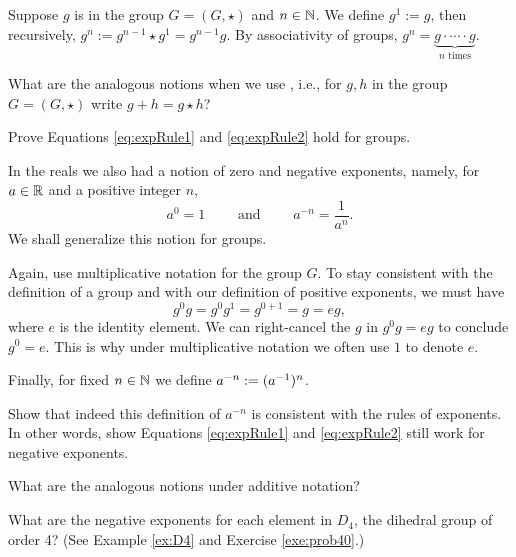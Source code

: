 \documentclass[../algebraNotesMSRI-UP2016.tex]{subfiles}
\begin{document}
\begin{frame}[c]
Suppose $g$ is in the group $G=(G,\star)$ and $n\in\mathbb N$.  We define $g^1:=g$, then recursively, $g^n:=g^{n-1}\star g^1=g^{n-1}g$.  By associativity of groups, $g^n=\underbrace{g\cdot\cdots \cdot g}_{\text{$n$ times}}$.

\smallGap
\begin{que}
What are the analogous notions when we use , i.e., for $g,h$ in the group $G=(G,\star)$ write $g+h=g\star h$?
\end{que}

\smallGap
\begin{exe}\label{exe:expRules1and2}
Prove Equations \eqref{eq:expRule1} and \eqref{eq:expRule2} hold for groups.
\end{exe}
\end{frame}

\begin{frame}[c]
In the reals we also had a notion of zero and negative exponents, namely, for $a\in\mathbb R$ and a positive integer $n$,
\[
a^0=1\qquad\text{ and }\qquad a^{-n}=\frac{1}{a^n}.
\]
We shall generalize this notion for groups.
\end{frame}

\begin{frame}[c]
Again, use multiplicative notation for the group $G$.  To stay consistent with the definition of a group and with our definition of positive exponents, we must have 
\[
g^0g = g^0g^1 = g^{0+1}=g =eg,
\]
where $e$ is the identity element.  We can right-cancel the $g$ in $g^0g=eg$ to conclude $g^0=e$.  This is why under multiplicative notation we often use $1$ to denote $e$.   

\smallGap
\end{frame}

\begin{frame}[c]
Finally, for fixed $n\in\mathbb N$ we define $a^{-n}:=(a^{-1})^n$.  

\smallGap
\begin{UNABexe}[cf. Problem 48]\label{exe:negExp}
Show that indeed this definition of $a^{-n}$ is consistent with the rules of exponents.  In other words, show Equations \eqref{eq:expRule1} and \eqref{eq:expRule2} still work for negative exponents.
\end{UNABexe}

\smallGap
\begin{que}
What are the analogous notions under additive notation?
\end{que}

\smallGap
\begin{exe}\label{exe:negExpD4}
What are the negative exponents for each element in $D_4$, the dihedral group of order 4?  (See Example \ref{ex:D4} and Exercise \ref{exe:prob40}.)
\end{exe}
\end{frame}
\end{document}
